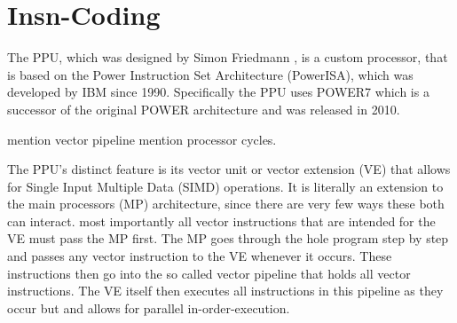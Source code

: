 \chapter{Insn-Coding}
\label{chapter:insn coding}

The PPU, which was designed by Simon Friedmann , is a custom processor, that is based on the Power Instruction Set Architecture (PowerISA), which was developed by IBM since 1990. 
Specifically the PPU uses POWER7 which is a successor of the original POWER architecture and was released in 2010.

mention vector pipeline
mention processor cycles.

The PPU's distinct feature is its vector unit or vector extension (VE) that allows for Single Input Multiple Data (SIMD) operations.
It is literally an extension to the main processors (MP) architecture, since there are very few ways these both can interact.
most importantly all vector instructions that are intended for the VE must pass the MP first.
The MP goes through the hole program step by step and passes any vector instruction to the VE whenever it occurs.
These instructions then go into the so called vector pipeline that holds all vector instructions.
The VE itself then executes all instructions in this pipeline as they occur but and allows for parallel in-order-execution.

